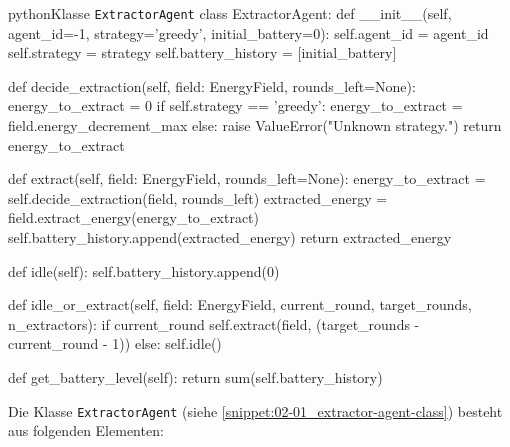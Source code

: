 \begin{snippet}[htb]
    \centering
    \begin{codebox}{python}{Klasse \texttt{ExtractorAgent}}
        class ExtractorAgent:
            def __init__(self, agent_id=-1, strategy='greedy', initial_battery=0):
                self.agent_id = agent_id
                self.strategy = strategy
                self.battery_history = [initial_battery]
            
            def decide_extraction(self, field: EnergyField, rounds_left=None):
                energy_to_extract = 0
                if self.strategy == 'greedy':
                    energy_to_extract = field.energy_decrement_max
                else:
                    raise ValueError("Unknown strategy.")
                return energy_to_extract
            
            def extract(self, field: EnergyField, rounds_left=None):
                energy_to_extract = self.decide_extraction(field, rounds_left)
                extracted_energy = field.extract_energy(energy_to_extract)
                self.battery_history.append(extracted_energy)
                return extracted_energy
            
            def idle(self):
                self.battery_history.append(0)

            def idle_or_extract(self, field: EnergyField, current_round, target_rounds, n_extractors):
                if current_round %
                    self.extract(field, (target_rounds - current_round - 1))
                else:
                    self.idle()
            
            def get_battery_level(self):
                return sum(self.battery_history)
    \end{codebox}
    \caption{Implementierung Klasse \texttt{ExtractorAgent}}
    \label{snippet:02-01_extractor-agent-class}
\end{snippet}

Die Klasse \texttt{ExtractorAgent} (siehe \autoref{snippet:02-01_extractor-agent-class}) besteht aus folgenden Elementen:

